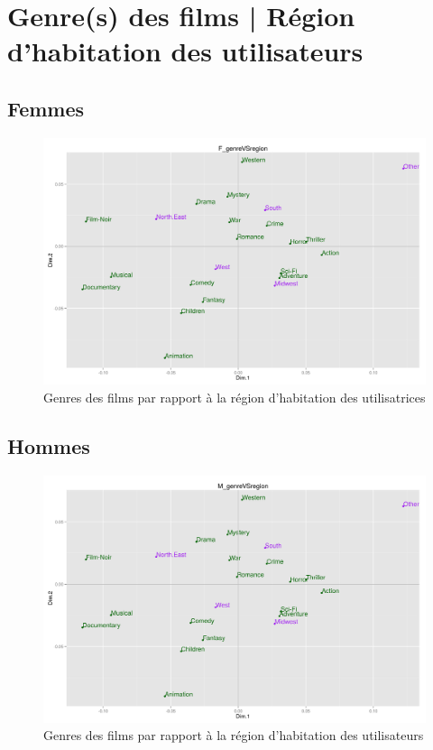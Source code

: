 \section{Genre(s) des films | Région d'habitation des utilisateurs}
\subsection{Femmes}
\begin{figure}[htd]
\centering
\includegraphics[scale=0.4]{./images/F_genreVSregion}
\caption{Genres des films par rapport à la région d'habitation des utilisatrices}
\end{figure}

\subsection{Hommes}
\begin{figure}[htd]
\centering
\includegraphics[scale=0.4]{./images/M_genreVSregion}
\caption{Genres des films par rapport à la région d'habitation des utilisateurs}
\end{figure}




